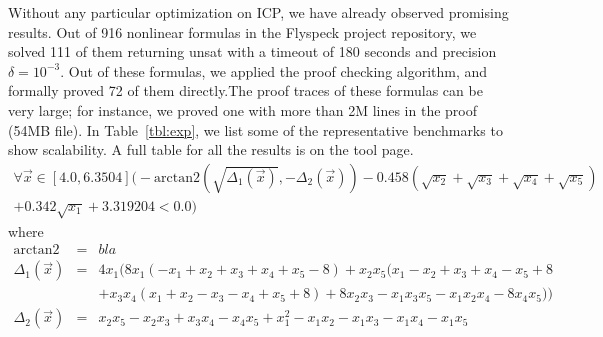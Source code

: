 Without any particular optimization on ICP, we have already observed
promising results. Out of 916 nonlinear formulas in the Flyspeck
project repository, we solved 111 of them returning {\sf unsat} with a
timeout of 180 seconds and precision $\delta=10^{-3}$. Out of these
formulas, we applied the proof checking algorithm, and formally proved
72 of them directly.The proof traces of these formulas can be very
large; for instance, we proved one with more than 2M lines in the
proof (54MB file). In Table~\ref{tbl:exp}, we list some of the
representative benchmarks to show scalability. A full table for all
the results is on the tool page.
\begin{multline*}
\forall\vec{x} \in [4.0, 6.3504]\Big(- \mathrm{arctan2}(\sqrt{\Delta_1(\vec{x})}, - \Delta_2(\vec{x})) - 0.458(\sqrt{x_2} + \sqrt{x_3} +\sqrt{x_4} + \sqrt{x_5})\\
 + 0.342\sqrt{x_1} + 3.319204 < 0.0\Big)
\end{multline*}
where
\begin{eqnarray*}
\mathrm{arctan2} &=& bla\\
  \Delta_1(\vec{x}) &=& 4x_1 (8x_1 (-x_1 + x_2 + x_3 + x_4 + x_5 - 8) + x_2 x_5 (x_1 - x_2 + x_3 + x_4 - x_5+8\\%
& &+ x_3x_4(x_1 + x_2 - x_3 - x_4 + x_5 + 8)+ 8 x_2 x_3 - x_1 x_3 x_5 - x_1  x_2  x_4 - 8 x_4 x_5))\\
\Delta_2(\vec{x}) &=& x_2 x_5 -x_2 x_3 + x_3x_4 - x_4 x_5 +x_1^2 -x_1x_2 - x_1x_3 - x_1x_4 -x_1 x_5
\end{eqnarray*}
